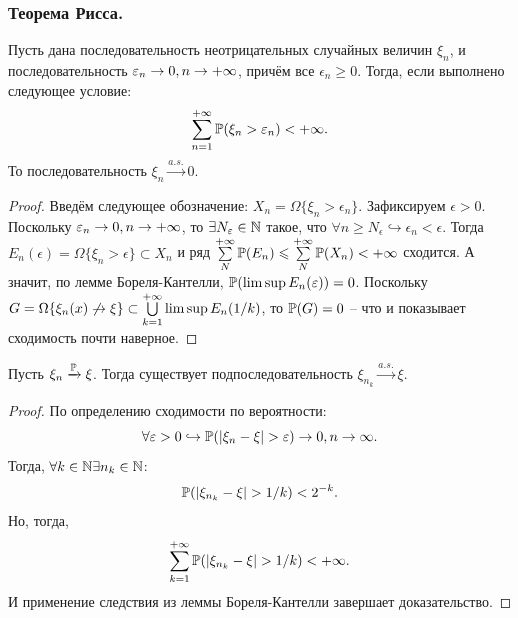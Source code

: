 \subsubsection{Теорема Рисса.}
\begin{lemma}
    Пусть дана последовательность неотрицательных случайных величин $\xi_n$, и последовательность $\epsilon_n \ra 0, n \ra +\infty$, причём все $\epsilon_n \geq 0$.
    Тогда, если выполнено следующее условие:
    \[
        \sum\limits_{n = 1}^{+\infty} \P(\xi_n > \epsilon_n) < +\infty.
    \]
    То последовательность $\xi_n \xrightarrow{a.s.} 0$.
\end{lemma}
\begin{proof}
    Введём следующее обозначение: $X_n = \Omega\{\xi_n > \epsilon_n\}$.
    Зафиксируем $\epsilon > 0$.
    Поскольку $\epsilon_n \ra 0, n \ra +\infty$, то $\exists N_\epsilon \in \N$ такое, что $\forall n \geq N_\epsilon \hookrightarrow \epsilon_n < \epsilon$.
    Тогда $E_n(\epsilon) = \Omega\{\xi_n > \epsilon\} \subset X_n$ и ряд $\sum\limits_{N}^{+\infty} \P(E_n) \leq \sum\limits_{N}^{+\infty} \P(X_n) < +\infty$ сходится.
    А значит, по лемме Бореля-Кантелли, $\P(\limsup E_n(\epsilon)) = 0$.
    Поскольку $G = \Omega\{\xi_n(x) \not\ra \xi\} \subset \bigcup\limits_{k = 1}^{+\infty} \limsup E_n(1/k)$, то $\P(G) = 0$ -- что и показывает сходимость почти наверное.
\end{proof}
\begin{theorem}[Рисс]
    Пусть $\xi_n \xrightarrow{\P} \xi$.
    Тогда существует подпоследовательность $\xi_{n_k} \xrightarrow{a.s.} \xi$.
\end{theorem}
\begin{proof}
    По определению сходимости по вероятности:
    \[
        \forall \epsilon > 0 \hookrightarrow \P(|\xi_n - \xi| > \epsilon) \ra 0, n \ra \infty.
    \]
    Тогда, $\forall k \in \N \exists n_k \in \N$:
    \[
        \P(|\xi_{n_k} - \xi| > 1/k) < 2^{-k}.
    \]
    Но, тогда,
    \[
        \sum\limits_{k = 1}^{+\infty} \P(|\xi_{n_k} - \xi| > 1/k) < +\infty.
    \]
    И применение следствия из леммы Бореля-Кантелли завершает доказательство.
\end{proof}
